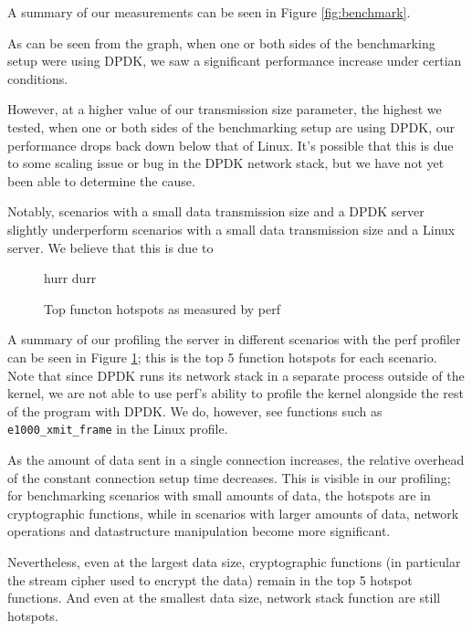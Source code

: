 \documentclass{sig-alternate-05-2015}
\begin{document}
A summary of our measurements can be seen in Figure \ref{fig:benchmark}.

As can be seen from the graph, when one or both sides of the benchmarking setup were using DPDK,
we saw a significant performance increase under certian conditions.

However, at a higher value of our transmission size parameter, the highest we tested,
when one or both sides of the benchmarking setup are using DPDK,
our performance drops back down below that of Linux.
It's possible that this is due to some scaling issue or bug in the DPDK network stack,
but we have not yet been able to determine the cause.

Notably, scenarios with a small data transmission size and a DPDK server
slightly underperform scenarios with a small data transmission size and a Linux server.
We believe that this is due to

\begin{figure}[bh]
\centering
hurr durr
\caption{Top functon hotspots as measured by perf}
\label{fig:profile}
\end{figure}

A summary of our profiling the server in different scenarios with the perf profiler
can be seen in Figure \ref{fig:profile};
this is the top 5 function hotspots for each scenario.
Note that since DPDK runs its network stack in a separate process outside of the kernel,
we are not able to use perf's ability to profile the kernel alongside the rest of the program with DPDK.
We do, however, see functions such as \verb|e1000_xmit_frame| in the Linux profile.

As the amount of data sent in a single connection increases,
the relative overhead of the constant connection setup time decreases.
This is visible in our profiling;
for benchmarking scenarios with small amounts of data, the hotspots are in cryptographic functions,
while in scenarios with larger amounts of data,
network operations and datastructure manipulation become more significant.

Nevertheless, even at the largest data size,
cryptographic functions (in particular the stream cipher used to encrypt the data)
remain in the top 5 hotspot functions.
And even at the smallest data size,
network stack function are still hotspots.
\end{document}
